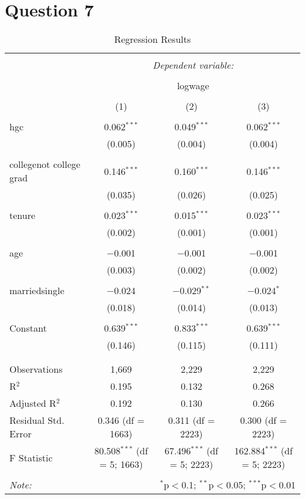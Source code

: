 \documentclass{article}
\begin{document}
\section{Question 7}
\begin{table}[!htbp] \centering 
  \caption{Regression Results} 
  \label{} 
\begin{tabular}{@{\extracolsep{5pt}}lccc} 
\\[-1.8ex]\hline 
\hline \\[-1.8ex] 
 & \multicolumn{3}{c}{\textit{Dependent variable:}} \\ 
\cline{2-4} 
\\[-1.8ex] & \multicolumn{3}{c}{logwage} \\ 
\\[-1.8ex] & (1) & (2) & (3)\\ 
\hline \\[-1.8ex] 
 hgc & 0.062$^{***}$ & 0.049$^{***}$ & 0.062$^{***}$ \\ 
  & (0.005) & (0.004) & (0.004) \\ 
  & & & \\ 
 collegenot college grad & 0.146$^{***}$ & 0.160$^{***}$ & 0.146$^{***}$ \\ 
  & (0.035) & (0.026) & (0.025) \\ 
  & & & \\ 
 tenure & 0.023$^{***}$ & 0.015$^{***}$ & 0.023$^{***}$ \\ 
  & (0.002) & (0.001) & (0.001) \\ 
  & & & \\ 
 age & $-$0.001 & $-$0.001 & $-$0.001 \\ 
  & (0.003) & (0.002) & (0.002) \\ 
  & & & \\ 
 marriedsingle & $-$0.024 & $-$0.029$^{**}$ & $-$0.024$^{*}$ \\ 
  & (0.018) & (0.014) & (0.013) \\ 
  & & & \\ 
 Constant & 0.639$^{***}$ & 0.833$^{***}$ & 0.639$^{***}$ \\ 
  & (0.146) & (0.115) & (0.111) \\ 
  & & & \\ 
\hline \\[-1.8ex] 
Observations & 1,669 & 2,229 & 2,229 \\ 
R$^{2}$ & 0.195 & 0.132 & 0.268 \\ 
Adjusted R$^{2}$ & 0.192 & 0.130 & 0.266 \\ 
Residual Std. Error & 0.346 (df = 1663) & 0.311 (df = 2223) & 0.300 (df = 2223) \\ 
F Statistic & 80.508$^{***}$ (df = 5; 1663) & 67.496$^{***}$ (df = 5; 2223) & 162.884$^{***}$ (df = 5; 2223) \\ 
\hline 
\hline \\[-1.8ex] 
\textit{Note:}  & \multicolumn{3}{r}{$^{*}$p$<$0.1; $^{**}$p$<$0.05; $^{***}$p$<$0.01} \\ 
\end{tabular} 
\end{table} 
\end{document}
